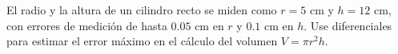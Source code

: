El radio y la altura de un cilindro recto se miden como $r = 5$ cm y $h = 12$ cm, con errores de medición de hasta $0.05$ cm en $r$ y $0.1$ cm en $h$. Use diferenciales para estimar el error máximo en el cálculo del volumen $V = \pi r^2 h$.
